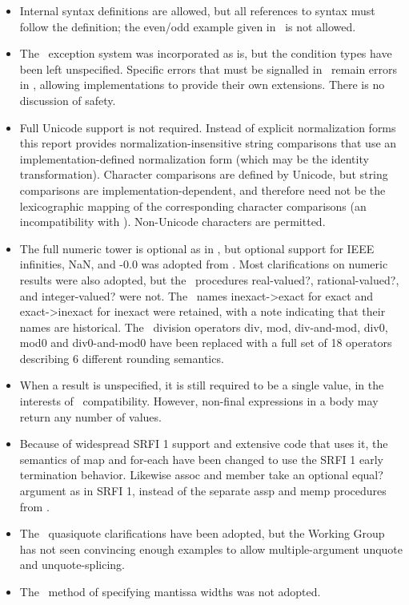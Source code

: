 \begin{itemize}
\item Internal syntax definitions are allowed, but all references to syntax
must follow the definition; the {\cf even}/{\cf odd} example given in
\rsixrs\ is not allowed.

\item The \rsixrs\ exception system was incorporated as is, but the condition
types have been left unspecified.  Specific errors that must be signalled
in \rsixrs\ remain errors in \rsevenrs, allowing implementations to provide
their own extensions.  There is no discussion of safety.

\item Full Unicode support is not required.
Instead of explicit normalization forms this report provides
normalization-insensitive string comparisons that use
an implementation-defined normalization form
(which may be the identity transformation). Character comparisons are
defined by Unicode, but string comparisons are implementation-dependent,
and therefore need not be the lexicographic mapping of the corresponding
character comparisons (an incompatibility with \rfivers). Non-Unicode
characters are permitted.

\item The full numeric tower is optional as in \rfivers, but optional support for IEEE
infinities, NaN, and {\mbox -0.0} was adopted from \rsixrs. Most clarifications on
numeric results were also adopted, but the \rsixrs\ procedures {\cf real-valued?},
{\cf rational-valued?}, and {\cf integer-valued}? were not. The \rfivers\ names
{\cf inexact->exact} for {\cf exact} and {\cf exact->inexact} for {\cf inexact} were retained,
with a note indicating that their names are historical.
The \rsixrs\ division operators {\cf div}, {\cf mod}, {\cf div-and-mod}, {\cf
div0}, {\cf mod0} and {\cf div0-and-mod0} have been replaced with a full
set of 18 operators describing 6 different rounding semantics.

\item When a result is unspecified, it is still required to be a single value,
in the interests of \rfivers\ compatibility. However, non-final expressions
in a body may return any number of values.

\item Because of widespread SRFI 1 support and extensive code
that uses it, the semantics of {\cf map} and {\cf for-each} have been changed to use
the SRFI 1 early termination behavior. Likewise
{\cf assoc} and {\cf member} take an optional {\cf equal?} argument as in SRFI 1,
instead of the separate {\cf assp} and {\cf memp} procedures from \rsixrs.

\item The \rsixrs~{\cf quasiquote} clarifications have been adopted, but the Working Group has not seen
convincing enough examples to allow multiple-argument {\cf unquote} and
{\cf unquote-splicing}.

\item The \rsixrs~method of specifying mantissa widths was not adopted.

\end{itemize}

